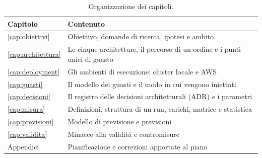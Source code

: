 \begin{table}[htbp]
\centering
\caption{Organizzazione dei capitoli.}
\label{tab:struttura}
\begin{tabularx}{\linewidth}{@{}lL@{}}
\toprule
\textbf{Capitolo} & \textbf{Contenuto} \\
\midrule
\ref{cap:obiettivi} & Obiettivo, domande di ricerca, ipotesi e ambito \\
\ref{cap:architettura} & Le cinque architetture, il percorso di un ordine e i punti unici di guasto \\
\ref{cap:deployment} & Gli ambienti di esecuzione: cluster locale e AWS \\
\ref{cap:guasti} & Il modello dei guasti e il modo in cui vengono iniettati \\
\ref{cap:decisioni} & Il registro delle decisioni architetturali (ADR) e i parametri \\
\ref{cap:misura} & Definizioni, struttura di un run, carichi, matrice e statistica \\
\ref{cap:previsioni} & Modello di previsione e previsioni \\
\ref{cap:validita} & Minacce alla validità e contromisure \\
Appendici & Pianificazione e correzioni apportate al piano \\
\bottomrule
\end{tabularx}
\end{table}
